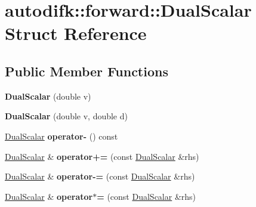 \hypertarget{structautodifk_1_1forward_1_1_dual_scalar}{\section{autodifk\-:\-:forward\-:\-:Dual\-Scalar Struct Reference}
\label{structautodifk_1_1forward_1_1_dual_scalar}
}
\subsection*{Public Member Functions}
\begin{DoxyCompactItemize}
\item 
\hypertarget{structautodifk_1_1forward_1_1_dual_scalar_a644f21b9238e1492c87dbf2410aaa429}{{\bfseries Dual\-Scalar} (double v)}\label{structautodifk_1_1forward_1_1_dual_scalar_a644f21b9238e1492c87dbf2410aaa429}

\item 
\hypertarget{structautodifk_1_1forward_1_1_dual_scalar_aa18242f5946144ace77cbd911d0d3f9f}{{\bfseries Dual\-Scalar} (double v, double d)}\label{structautodifk_1_1forward_1_1_dual_scalar_aa18242f5946144ace77cbd911d0d3f9f}

\item 
\hypertarget{structautodifk_1_1forward_1_1_dual_scalar_aa5ecf8d86d75273eef402bbd27578304}{\hyperlink{structautodifk_1_1forward_1_1_dual_scalar}{Dual\-Scalar} {\bfseries operator-\/} () const }\label{structautodifk_1_1forward_1_1_dual_scalar_aa5ecf8d86d75273eef402bbd27578304}

\item 
\hypertarget{structautodifk_1_1forward_1_1_dual_scalar_ad81932a8fda687d7dc87741363f0ecba}{\hyperlink{structautodifk_1_1forward_1_1_dual_scalar}{Dual\-Scalar} \& {\bfseries operator+=} (const \hyperlink{structautodifk_1_1forward_1_1_dual_scalar}{Dual\-Scalar} \&rhs)}\label{structautodifk_1_1forward_1_1_dual_scalar_ad81932a8fda687d7dc87741363f0ecba}

\item 
\hypertarget{structautodifk_1_1forward_1_1_dual_scalar_a44f50035ebb486e8610d5da01b5900e6}{\hyperlink{structautodifk_1_1forward_1_1_dual_scalar}{Dual\-Scalar} \& {\bfseries operator-\/=} (const \hyperlink{structautodifk_1_1forward_1_1_dual_scalar}{Dual\-Scalar} \&rhs)}\label{structautodifk_1_1forward_1_1_dual_scalar_a44f50035ebb486e8610d5da01b5900e6}

\item 
\hypertarget{structautodifk_1_1forward_1_1_dual_scalar_ab58fd4d4e986d0dc8d6a5a433fa9a48e}{\hyperlink{structautodifk_1_1forward_1_1_dual_scalar}{Dual\-Scalar} \& {\bfseries operator$\ast$=} (const \hyperlink{structautodifk_1_1forward_1_1_dual_scalar}{Dual\-Scalar} \&rhs)}\label{structautodifk_1_1forward_1_1_dual_scalar_ab58fd4d4e986d0dc8d6a5a433fa9a48e}


\end{DoxyCompactItemize}

